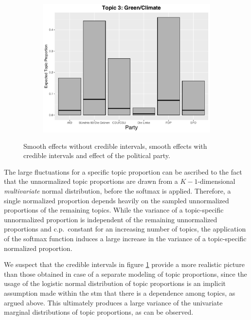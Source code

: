 \begin{figure}[h!]
\begin{subfigure}[b]{0.3\linewidth}
  \end{subfigure}
  \begin{subfigure}[b]{0.3\linewidth}
    \includegraphics[width=\linewidth]{../plots/4_4/direct_t3_cat.pdf}
  \end{subfigure}
  \caption{Smooth effects without credible intervals, smooth effects with credible intervals and effect of the political party.}
  \label{fig:directassessment}
\end{figure}

The large fluctuations for a specific topic proportion can be ascribed to the fact that the unnormalized topic proportions are drawn from a $K-1$-dimensional \textit{multivariate} normal distribution, before the softmax is applied. Therefore, a single normalized proportion depends heavily on the sampled unnormalized proportions of the remaining topics. While the variance of a topic-specific unnormalized proportion is independent of the remaining unnormalized proportions and c.p.\ constant for an increasing number of topics, the application of the softmax function induces a large increase in the variance of a topic-specific normalized proportion.

We suspect that the credible intervals in figure \ref{fig:directassessment} provide a more realistic picture than those obtained in case of a separate modeling of topic proportions, since the usage of the logistic normal distribution of topic proportions is an implicit assumption made within the stm that there is a dependence among topics, as argued above. This ultimately produces a large variance of the univariate marginal distributions of topic proportions, as can be observed.

